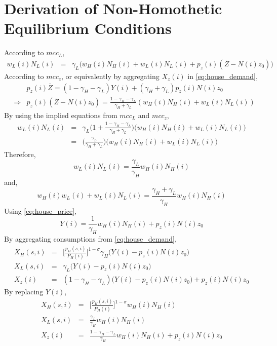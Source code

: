 \documentclass{article}
\begin{document}
\section{Derivation of Non-Homothetic Equilibrium Conditions} 

According to $mcc_L$,
\begin{eqnarray}
	w_L(i) N_L(i) & = & \gamma_L \Big( w_H(i) N_H(i) + w_L(i) N_L(i) + p_z(i) (\bar{Z}-N(i)z_0) \Big) \nonumber
\end{eqnarray}
According to $mcc_z$, or equivalently by aggregating $X_z(i)$ in \eqref{eq:house_demand},
\begin{eqnarray}
	& & p_z(i)\bar{Z} = (1-\gamma_H-\gamma_L)Y(i) + (\gamma_H+\gamma_L)p_z(i)N(i)z_0 \nonumber \\
	& \Rightarrow &
    \label{eq:house_price}
	p_z(i) (\bar{Z}-N(i)z_0) = \frac{1-\gamma_H-\gamma_L}{\gamma_H+\gamma_L}(w_H(i) N_H(i) + w_L(i) N_L(i)) 
\end{eqnarray}
By using the implied equations from $mcc_L$ and $mcc_z$,
\begin{eqnarray}
	w_L(i) N_L(i)
	& = &  \gamma_L\Big(1+\frac{1-\gamma_H-\gamma_L}{\gamma_H+\gamma_L} \Big) \Big( w_H(i) N_H(i) + w_L(i) N_L(i) \Big) \nonumber \\
	& = &
	\Big(\frac{\gamma_L}{\gamma_H+\gamma_L} \Big) \Big( w_H(i) N_H(i) + w_L(i) N_L(i) \Big) \nonumber
\end{eqnarray}
Therefore,
\begin{equation}
	 w_L(i) N_L(i)= \frac{\gamma_L}{\gamma_H} w_H(i) N_H(i) \nonumber
\end{equation}
and,
\[
	 w_H(i) w_L(i) + w_L(i) N_L(i)= \frac{\gamma_H+\gamma_L}{\gamma_H} w_H(i) N_H(i) 
\]
Using \eqref{eq:house_price},
\[
	Y(i) = \frac{1}{\gamma_H} w_H(i)N_H(i) + p_z(i)N(i)z_0	
\]
By aggregating consumptions from \eqref{eq:house_demand},
\begin{eqnarray}
	X_H(s,i) & = & \Big[ \frac{p_H(s,i)}{P_H(i)} \Big]^{1-\sigma} \gamma_H \Big(Y(i)-p_z(i)N(i)z_0\Big) \nonumber \\
	X_L(s,i) & = & \gamma_L \Big(Y(i)-p_z(i)N(i)z_0\Big) \nonumber \\
	X_z(i) & = & (1-\gamma_H-\gamma_L)\Big(Y(i)-p_z(i)N(i)z_0\Big) + p_z(i)N(i)z_0 \nonumber
\end{eqnarray}
By replacing $Y(i)$,
\begin{eqnarray}
	X_H(s,i) & = & \Big[ \frac{p_H(s,i)}{P_H(i)} \Big]^{1-\sigma} w_H(i)N_H(i) \nonumber \\
	X_L(s,i) & = & \frac{\gamma_L}{\gamma_H} w_H(i)N_H(i) \nonumber \\
	X_z(i) & = & \frac{1-\gamma_H-\gamma_L}{\gamma_H}w_H(i)N_H(i) + p_z(i)N(i)z_0
\end{eqnarray}
\end{document}
